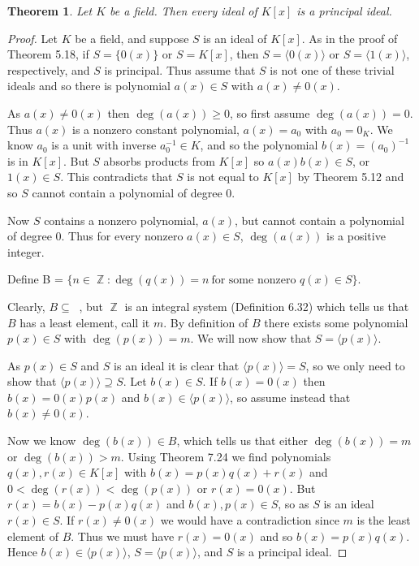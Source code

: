 \documentclass[letterpaper, 12pt]{article}
\DeclareMathOperator{\Z}{\mathbb{Z}}
\DeclareMathOperator{\Zp}{\mathbb{Z}^{+}}
\newcommand{\pid}[1]{\langle #1 \rangle}
\newtheorem{thm}{Theorem}
\begin{document}
			\setcounter{thm}{25}
			\begin{thm}
			Let $K$ be a field. 
			Then every ideal of $K[x]$ is a principal ideal.
			\end{thm}
			\color{ForestGreen}
			\begin{proof}
			Let $K$ be a field, and suppose $S$ is an ideal of $K[x]$. 
			As in the proof of Theorem 5.18, if $S = \{0(x)\}$ or $S = K[x]$, then $S = \pid{0(x)}$ or $S = \pid{1(x)}$, respectively, and $S$ is principal. 
			Thus assume that $S$ is not one of these trivial ideals and so there is polynomial $a(x) \in S$ with $a(x) \neq 0(x)$.

			As $a(x) \neq 0(x)$ then $\deg(a(x)) \geq 0$, so first assume $\deg(a(x)) = 0$.
			Thus $a(x)$ is a nonzero constant polynomial, $a(x) = a_{0}$ with $a_{0} = 0_{K}$. 
			We know $a_{0}$ is a unit with inverse $a_{0}^{-1} \in K$, and so the polynomial $b(x) = (a_{0})^{-1}$ is in $K[x]$. 
			But $S$ absorbs products from $K[x]$ so $a(x)b(x) \in S$, or $1(x) \in S$. 
			This contradicts that $S$ is not equal to $K[x]$ by Theorem 5.12 and so $S$ cannot contain a polynomial of degree 0.
			
			Now $S$ contains a nonzero polynomial, $a(x)$, but cannot contain a polynomial of degree 0.
			Thus for every nonzero $a(x) \in S$, $\deg(a(x))$ is a positive integer.
			
			\begin{center}{Define B = $\{n \in \Z : \deg(q(x)) = n \ \text{for some nonzero } q(x) \in S \}$.}\end{center}
			
			Clearly, $B \subseteq \Zp$, but $\Z$ is an integral system (Definition 6.32) which tells us that $B$ has a least element, call it $m$. 
			By definition of $B$ there exists some polynomial $p(x) \in S$ with $\deg(p(x)) = m$. 
			We will now show that $S = \pid{p(x)}$.
			
			As $p(x) \in S$ and $S$ is an ideal it is clear that $\pid{p(x)} = S$, so we only need to show that $\pid{p(x)} \supseteq S$. 
			Let $b(x) \in S$. 
			If $b(x) = 0(x)$ then $b(x) = 0(x)p(x)$ and $b(x) \in \pid{p(x)}$, so assume instead that $b(x) \neq 0(x)$.

			Now we know $\deg(b(x)) \in B$, which tells us that either $\deg(b(x)) = m$ or $\deg(b(x)) > m$. 
			Using Theorem 7.24 we find polynomials $q(x),r(x) \in K[x]$ with $b(x) = p(x)q(x) +r(x)$ and $0 < \deg(r(x)) < \deg(p(x))$ or $r(x) = 0(x)$. 
			But $r(x) = b(x) - p(x)q(x)$ and $b(x),p(x) \in S$, so as $S$ is an ideal $r(x) \in S$. 
			If $r(x) \neq 0(x)$ we would have a contradiction since $m$ is the least element of $B$. 
			Thus we must have $r(x) = 0(x)$ and so $b(x) = p(x)q(x)$. 
			Hence $b(x) \in \pid{p(x)}$, $S = \pid{p(x)}$, and $S$ is a principal ideal.
			\end{proof}
			\color{black}
\end{document}
